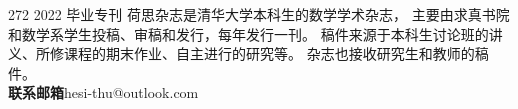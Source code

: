 \documentclass{article}
\begin{document}
    \MakeCover
    {   %
        272
    }{  %
        2022
    }{  %
        毕业专刊
    }{  %
        荷思杂志是清华大学本科生的数学学术杂志，
        主要由求真书院和数学系学生投稿、审稿和发行，每年发行一刊。
        稿件来源于本科生讨论班的讲义、所修课程的期末作业、自主进行的研究等。
        杂志也接收研究生和教师的稿件。 \\[5pt]
        \textbf{联系邮箱}\quad hesi-thu@outlook.com
    }
\end{document}
